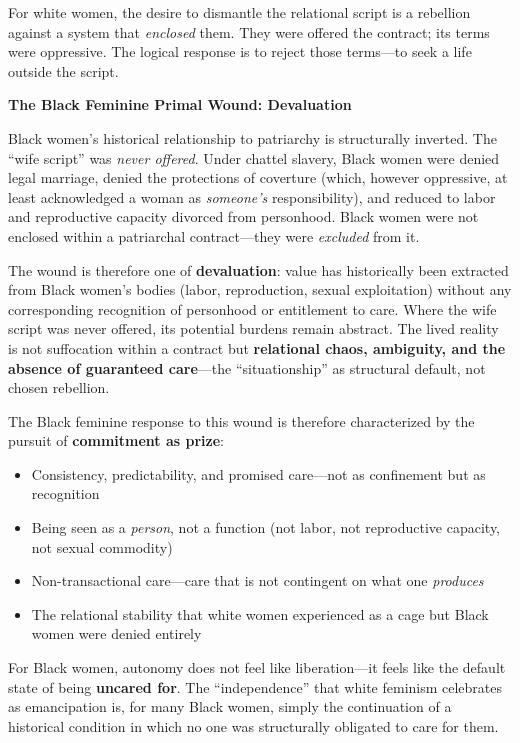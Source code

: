 \documentclass[12pt,openany]{book}
\numberwithin{equation}{chapter}
\begin{document}
For white women, the desire to dismantle the relational script is a rebellion against a system that \textit{enclosed} them. They were offered the contract; its terms were oppressive. The logical response is to reject those terms---to seek a life outside the script.

\textbf{The Black Feminine Primal Wound: Devaluation}

Black women's historical relationship to patriarchy is structurally inverted. The ``wife script'' was \textit{never offered}. Under chattel slavery, Black women were denied legal marriage, denied the protections of coverture (which, however oppressive, at least acknowledged a woman as \textit{someone's} responsibility), and reduced to labor and reproductive capacity divorced from personhood. Black women were not enclosed within a patriarchal contract---they were \textit{excluded} from it.

The wound is therefore one of \textbf{devaluation}: value has historically been extracted from Black women's bodies (labor, reproduction, sexual exploitation) without any corresponding recognition of personhood or entitlement to care. Where the wife script was never offered, its potential burdens remain abstract. The lived reality is not suffocation within a contract but \textbf{relational chaos, ambiguity, and the absence of guaranteed care}---the ``situationship'' as structural default, not chosen rebellion.

The Black feminine response to this wound is therefore characterized by the pursuit of \textbf{commitment as prize}:

\begin{itemize}
    \item Consistency, predictability, and promised care---not as confinement but as recognition
    \item Being seen as a \textit{person}, not a function (not labor, not reproductive capacity, not sexual commodity)
    \item Non-transactional care---care that is not contingent on what one \textit{produces}
    \item The relational stability that white women experienced as a cage but Black women were denied entirely
\end{itemize}

For Black women, autonomy does not feel like liberation---it feels like the default state of being \textbf{uncared for}. The ``independence'' that white feminism celebrates as emancipation is, for many Black women, simply the continuation of a historical condition in which no one was structurally obligated to care for them.
\end{document}
